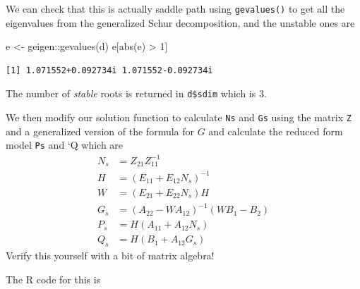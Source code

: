 \documentclass[
  letterpaper,
]{book}
\newenvironment{Shaded}{\begin{snugshade}}{\end{snugshade}}
\newcommand{\DecValTok}[1]{\textcolor[rgb]{0.68,0.00,0.00}{#1}}
\newcommand{\FunctionTok}[1]{\textcolor[rgb]{0.28,0.35,0.67}{#1}}
\newcommand{\NormalTok}[1]{\textcolor[rgb]{0.00,0.23,0.31}{#1}}
\newcommand{\OtherTok}[1]{\textcolor[rgb]{0.00,0.23,0.31}{#1}}
\newcommand{\SpecialCharTok}[1]{\textcolor[rgb]{0.37,0.37,0.37}{#1}}
\begin{document}
We can check that this is actually saddle path using \texttt{gevalues()}
to get all the eigenvalues from the generalized Schur decomposition, and
the unstable ones are

\begin{Shaded}
\begin{Highlighting}[]
\NormalTok{e }\OtherTok{\textless{}{-}}\NormalTok{ geigen}\SpecialCharTok{::}\FunctionTok{gevalues}\NormalTok{(d)}
\NormalTok{e[}\FunctionTok{abs}\NormalTok{(e) }\SpecialCharTok{\textgreater{}} \DecValTok{1}\NormalTok{]}
\end{Highlighting}
\end{Shaded}

\begin{verbatim}
[1] 1.071552+0.092734i 1.071552-0.092734i
\end{verbatim}

The number of \emph{stable} roots is returned in \texttt{d\$sdim} which
is 3.

We then modify our solution function to calculate \texttt{Ns} and
\texttt{Gs} using the matrix \texttt{Z} and a generalized version of the
formula for \(G\) and calculate the reduced form model \texttt{Ps} and
`Q which are \[
\begin{align}
    N_s &= Z_{21} Z_{11}^{-1} \\
    H   &= (E_{11} + E_{12} N_s)^{-1} \\
    W   &= (E_{21} + E_{22} N_s) H\\
    G_s &= (A_{22} - W A_{12})^{-1} (W B_1 - B_2) \\
    P_s &= H (A_{11} + A_{12} N_s) \\
    Q_s &= H (B_1 + A_{12} G_s)
\end{align}
\] Verify this yourself with a bit of matrix algebra!

The R code for this is
\end{document}
